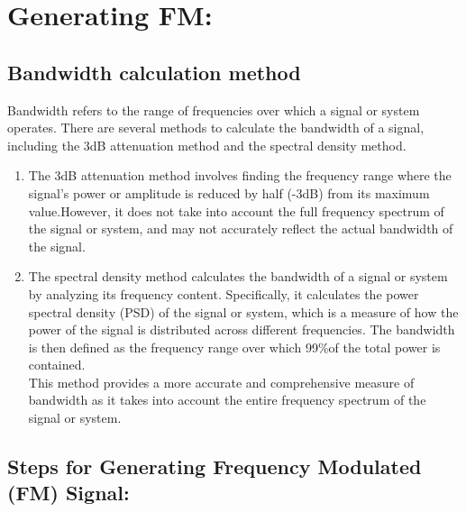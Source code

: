 \documentclass[journal,5pt,twocolumn]{IEEEtran}
\begin{document}
\section{\textbf{Generating FM:}}
\subsection{\textbf{Bandwidth calculation method}}

Bandwidth refers to the range of frequencies over which a signal or system operates. There are several methods to calculate the bandwidth of a signal, including the 3dB attenuation method and the spectral density method.\\
\begin{enumerate}
\item  The 3dB attenuation method involves finding the frequency range where the signal's power or amplitude is reduced by half (-3dB) from its maximum value.However, it does not take into account the full frequency spectrum of the signal or system, and may not accurately reflect the actual bandwidth of the signal.

\item The spectral density method calculates the bandwidth of a signal or system by analyzing its frequency content. Specifically, it calculates the power spectral density (PSD) of the signal or system, which is a measure of how the power of the signal is distributed across different frequencies. The bandwidth is then defined as the frequency range over which 99\%of the total power is contained.\\
 This method provides a more accurate and comprehensive measure of bandwidth as it takes into account the entire frequency spectrum of the signal or system.
\end{enumerate}

\subsection{\textbf{Steps for Generating Frequency Modulated (FM) Signal:}}
   
\end{document}
